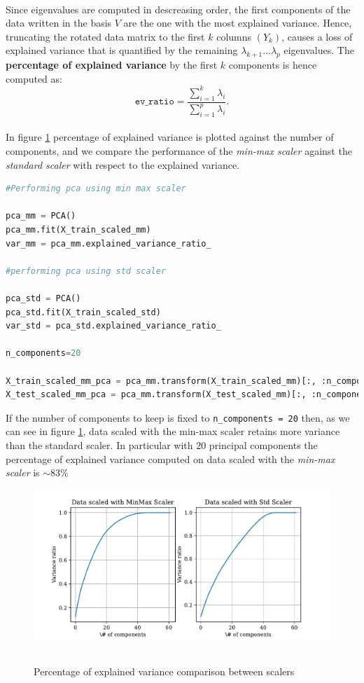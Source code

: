 \\
Since eigenvalues are computed in descreasing order, the first components of the data written in the basis \(V\) are the one with the most explained variance. Hence, truncating the rotated data matrix to the first \(k\) columns \((Y_k)\), causes a loss of explained variance that is quantified by the remaining \(\lambda_{k+ 1}\dots \lambda_p\) eigenvalues. The \textbf{percentage of explained variance} by the first \(k\) components is hence computed as:
\begin{equation}
     \texttt{ev\_ratio} = \frac{\sum \limits_{i= 1}^{k} \lambda_i}{\sum \limits_{i= 1}^{p} \lambda_i}. 
\end{equation}
\\
In figure \ref{fig_PCA} percentage of explained variance is plotted against the number of components, and we compare the performance of the \textit{min-max scaler} against the \textit{standard scaler} with respect to the explained variance.

\begin{lstlisting}[language=Python, caption= Data scaling]
#Performing pca using min max scaler

pca_mm = PCA()
pca_mm.fit(X_train_scaled_mm)
var_mm = pca_mm.explained_variance_ratio_

#performing pca using std scaler

pca_std = PCA()
pca_std.fit(X_train_scaled_std)
var_std = pca_std.explained_variance_ratio_

n_components=20

X_train_scaled_mm_pca = pca_mm.transform(X_train_scaled_mm)[:, :n_components]
X_test_scaled_mm_pca = pca_mm.transform(X_test_scaled_mm)[:, :n_components]
\end{lstlisting}
If the number of components to keep is fixed to \texttt{n\_components = 20} then, as we can see in figure \ref{fig_PCA}, data scaled with the min-max scaler retains more variance than the standard scaler. In particular with \(20\) principal components the percentage of explained variance computed on data scaled with the \textit{min-max scaler} is \(\sim 83\%\)
\begin{figure}[htb]
    \centering
    \includegraphics[scale=0.7]{pictures/variance_ratio_PCA.pdf}\
    \caption{Percentage of explained variance comparison between scalers}
    \label{fig_PCA}
\end{figure}

